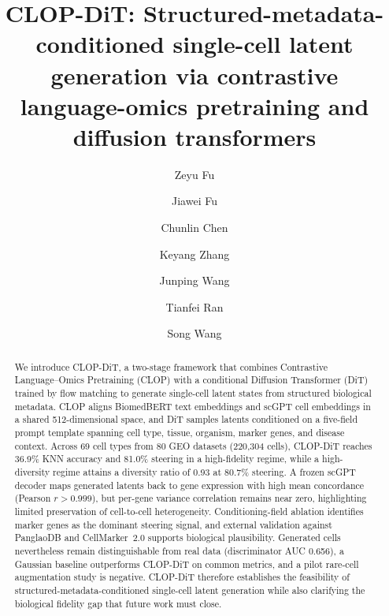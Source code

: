 \documentclass[preprint,12pt]{elsarticle}
\begin{document}
        \begin{frontmatter}

        \title{CLOP-DiT: Structured-metadata-conditioned single-cell latent generation via contrastive language-omics pretraining and diffusion transformers}

        \author[aff1]{Zeyu Fu}
        \author[aff2]{Jiawei Fu}
        \author[aff3]{Chunlin Chen}
        \author[aff4]{Keyang Zhang}
        \author[aff1]{Junping Wang}
        \author[aff2]{Tianfei Ran}
        \author[aff1]{Song Wang}


        \address[aff1]{State Key Laboratory of Trauma and Chemical Poisoning, Institute of Combined Injury, Chongqing Engineering Research Center for Nanomedicine, College of Preventive Medicine, Army Medical University, Chongqing 400038, China}
        \address[aff2]{Department of Orthopedics, Xinqiao Hospital, Army Medical University, Chongqing 400037, China}
        \address[aff3]{Department of Rehabilitation Medicine, The First Affiliated Hospital, Sun Yat-sen University, Guangzhou 510080, China}
        \address[aff4]{School of Medicine, Sun Yat-sen University, Shenzhen 518107, China}

        \begin{abstract}
        We introduce CLOP-DiT, a two-stage framework that combines Contrastive Language--Omics Pretraining (CLOP) with a conditional Diffusion Transformer (DiT) trained by flow matching to generate single-cell latent states from structured biological metadata. CLOP aligns BiomedBERT text embeddings and scGPT cell embeddings in a shared 512-dimensional space, and DiT samples latents conditioned on a five-field prompt template spanning cell type, tissue, organism, marker genes, and disease context. Across 69 cell types from 80 GEO datasets (220{,}304 cells), CLOP-DiT reaches 36.9\% KNN accuracy and 81.0\% steering in a high-fidelity regime, while a high-diversity regime attains a diversity ratio of 0.93 at 80.7\% steering. A frozen scGPT decoder maps generated latents back to gene expression with high mean concordance (Pearson $r > 0.999$), but per-gene variance correlation remains near zero, highlighting limited preservation of cell-to-cell heterogeneity. Conditioning-field ablation identifies marker genes as the dominant steering signal, and external validation against PanglaoDB and CellMarker~2.0 supports biological plausibility. Generated cells nevertheless remain distinguishable from real data (discriminator AUC 0.656), a Gaussian baseline outperforms CLOP-DiT on common metrics, and a pilot rare-cell augmentation study is negative. CLOP-DiT therefore establishes the feasibility of structured-metadata-conditioned single-cell latent generation while also clarifying the biological fidelity gap that future work must close.
        \end{abstract}


\end{frontmatter}
\end{document}
